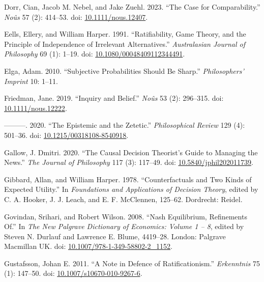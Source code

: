 \documentclass[
  10pt,
  letterpaper,
  DIV=11,
  numbers=noendperiod,
  twoside]{scrartcl}
\newlength{\cslhangindent}
\newenvironment{CSLReferences}[2] %
 {\begin{list}{}{%
  \setlength{\itemindent}{0pt}
  \setlength{\leftmargin}{0pt}
  \setlength{\parsep}{0pt}
  \ifodd #1
   \setlength{\leftmargin}{\cslhangindent}
   \setlength{\itemindent}{-1\cslhangindent}
  \fi
  \setlength{\itemsep}{#2\baselineskip}}}
 {\end{list}}
\begin{document}
\begin{CSLReferences}{1}{0}
Dorr, Cian, Jacob M. Nebel, and Jake Zuehl. 2023. {``The Case for
Comparability.''} \emph{Noûs} 57 (2): 414--53. doi:
\href{https://doi.org/10.1111/nous.12407}{10.1111/nous.12407}.

Eells, Ellery, and William Harper. 1991. {``Ratifiability, Game Theory,
and the Principle of Independence of Irrelevant Alternatives.''}
\emph{Australasian Journal of Philosophy} 69 (1): 1--19. doi:
\href{https://doi.org/10.1080/00048409112344491}{10.1080/00048409112344491}.

Elga, Adam. 2010. {``Subjective Probabilities Should Be Sharp.''}
\emph{Philosophers' Imprint} 10: 1--11.

Friedman, Jane. 2019. {``Inquiry and Belief.''} \emph{No{û}s} 53 (2):
296--315. doi:
\href{https://doi.org/10.1111/nous.12222}{10.1111/nous.12222}.

---------. 2020. {``The Epistemic and the Zetetic.''}
\emph{Philosophical Review} 129 (4): 501--36. doi:
\href{https://doi.org/10.1215/00318108-8540918}{10.1215/00318108-8540918}.

Gallow, J. Dmitri. 2020. {``The Causal Decision Theorist's Guide to
Managing the News.''} \emph{The Journal of Philosophy} 117 (3): 117--49.
doi:
\href{https://doi.org/10.5840/jphil202011739}{10.5840/jphil202011739}.

Gibbard, Allan, and William Harper. 1978. {``Counterfactuals and Two
Kinds of Expected Utility.''} In \emph{Foundations and Applications of
Decision Theory}, edited by C. A. Hooker, J. J. Leach, and E. F.
McClennen, 125--62. Dordrecht: Reidel.

Govindan, Srihari, and Robert Wilson. 2008. {``Nash Equilibrium,
Refinements Of.''} In \emph{The New Palgrave Dictionary of Economics:
Volume 1 -- 8}, edited by Steven N. Durlauf and Lawrence E. Blume,
4419--28. London: Palgrave Macmillan UK. doi:
\href{https://doi.org/10.1007/978-1-349-58802-2_1152}{10.1007/978-1-349-58802-2\_1152}.

Gustafsson, Johan E. 2011. {``A Note in Defence of Ratificationism.''}
\emph{Erkenntnis} 75 (1): 147--50. doi:
\href{https://doi.org/10.1007/s10670-010-9267-6}{10.1007/s10670-010-9267-6}.


\end{CSLReferences}
\end{document}
